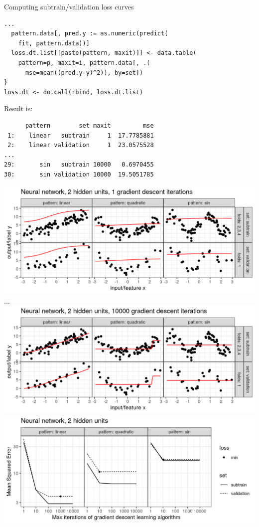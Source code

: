 \documentclass{article}
\begin{document}
{Computing subtrain/validation loss curves}
\begin{verbatim}
...
  pattern.data[, pred.y := as.numeric(predict(
    fit, pattern.data))]
  loss.dt.list[[paste(pattern, maxit)]] <- data.table(
    pattern=p, maxit=i, pattern.data[, .(
      mse=mean((pred.y-y)^2)), by=set])
}
loss.dt <- do.call(rbind, loss.dt.list)
\end{verbatim}
Result is:  
\begin{verbatim}
      pattern        set maxit         mse
 1:    linear   subtrain     1  17.7785881
 2:    linear validation     1  23.0575528
...
29:       sin   subtrain 10000   0.6970455
30:       sin validation 10000  19.5051785
\end{verbatim}

\includegraphics[width=\textwidth]{figure-overfitting-pred-units=2-maxit=1.png}
...
\includegraphics[width=\textwidth]{figure-overfitting-pred-units=2-maxit=10000.png}
\includegraphics[width=\textwidth]{figure-overfitting-data-loss-2.png}
\end{document}
